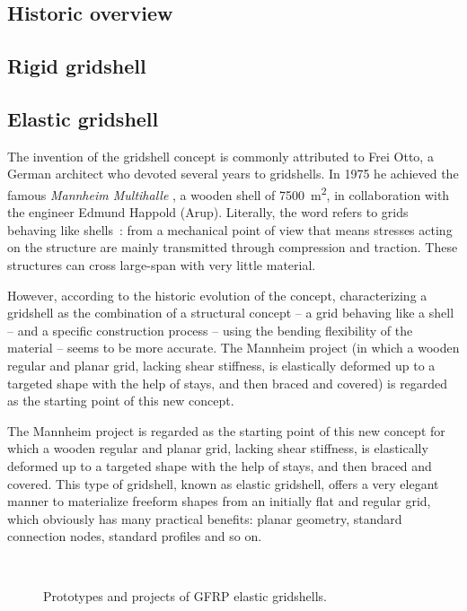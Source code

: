\subsection{Historic overview}
\subsection{Rigid gridshell}
\subsection{Elastic gridshell}

The invention of the gridshell concept is commonly attributed to Frei Otto, a German architect who devoted several years to gridshells. In 1975 he achieved the famous \emph{Mannheim Multihalle} \cite{Happold1975}, a wooden shell of 7500~m\textsuperscript{2}, in collaboration with the engineer Edmund Happold (Arup).
Literally, the word  refers to grids behaving like shells~: from a mechanical point of view that means stresses acting on the structure are mainly transmitted through compression and traction. These structures can cross large-span with very little material.

However, according to the historic evolution of the concept, characterizing a gridshell as the combination of a structural concept -- a grid behaving like a shell -- and a specific construction process -- using the bending flexibility of the material -- seems to be more accurate. The Mannheim project (in which a wooden regular and planar grid, lacking shear stiffness, is elastically deformed up to a targeted shape with the help of stays, and then braced and covered) is regarded as the starting point of this new concept.

The Mannheim project is regarded as the starting point of this new concept for which a wooden regular and planar grid, lacking shear stiffness, is elastically deformed up to a targeted shape with the help of stays, and then braced and covered.
This type of gridshell, known as elastic gridshell, offers a very elegant manner to materialize freeform shapes from an initially flat and regular grid, which obviously has many practical benefits: planar geometry, standard connection nodes, standard profiles and so on.


\begin{figure}[h]
		\captionsetup[subfloat]{captionskip=10pt}
		\\
		\hspace*{\fill}
		\vspace{10pt}
		\caption{Prototypes and projects of GFRP elastic gridshells.}
		\label{fig:proto}    
\end{figure}

